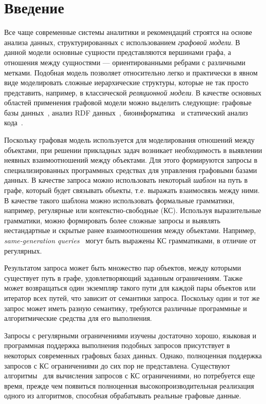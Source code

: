 \section*{Введение}

Все чаще современные системы аналитики и рекомендаций строятся на основе анализа данных, структурированных с использованием \textit{графовой модели}. В данной модели основные сущности представляются вершинами графа, а отношения между сущностями --- ориентированными ребрами с различными метками. Подобная модель позволяет относительно легко и практически в явном виде моделировать сложные иерархические структуры, которые не так просто представить, например, в классической \textit{реляционной модели}. В качестве основных областей применения графовой модели можно выделить следующие: графовые базы данных~\cite{article:querying_graph_databases}, анализ RDF данных~\cite{article:cfpq_and_rdf_analysis}, биоинформатика~\cite{article:rna_prediction} и статический анализ кода~\cite{article:dyck_cfl_code_analysis}.

Поскольку графовая модель используется для моделирования отношений между объектами, при решении прикладных задач возникает необходимость в выявлении неявных взаимоотношений между объектами. Для этого  формируются запросы в специализированных программных средствах для управления графовыми базами данных. В качестве запроса можно использовать некоторый \textit{шаблон} на путь в графе, который будет связывать объекты, т.е. выражать взаимосвязь между ними. В качестве такого шаблона можно использовать формальные грамматики, например, регулярные или контекстно-свободные (КС). Используя выразительные грамматики, можно формировать более сложные запросы и выявлять нестандартные и скрытые ранее взаимоотношения между объектами. Например, \textit{same-generation queries}~\cite{inbook:databases_intro} могут быть выражены КС грамматиками, в отличие от регулярных.

Результатом запроса может быть множество пар объектов, между которыми существует путь в графе, удовлетворяющий заданным ограничениям. Также может возвращаться один экземпляр такого пути для каждой пары объектов или итератор всех путей, что зависит от семантики запроса. Поскольку один и тот же запрос может иметь разную семантику, требуются различные программные и алгоритмические средства для его выполнения.  

Запросы с регулярными ограничениями изучены достаточно хорошо, языковая и программная поддержка выполнения подобных запросов присутствует в некоторых современных графовых базах данных. Однако, полноценная поддержка запросов с КС ограничениями до сих пор не представлена. Существуют алгоритмы~\cite{article:cfpq_and_rdf_analysis, article:hellings_cfpq, inproceedings:matrix_cfpq, inbook:kronecker_cfpq_adbis, article:cfpq_go_for_rdf} для вычисления запросов с КС ограничениями, но потребуется еще время, прежде чем появиться полноценная высокопроизводительная реализация одного из алгоритмов, способная обрабатывать реальные графовые данные.

